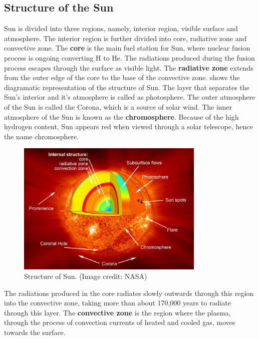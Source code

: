 \message{ !name(main.tex)}\documentclass[12pt]{article}
\begin{document}
\subsection{Structure of the Sun}

Sun is divided into three regions, namely, interior region, visible surface and atmosphere. The interior region is further divided into core, radiative zone and convective zone. The \textbf{core} is the main fuel station for Sun, where nuclear fusion process is ongoing converting H to He. The radiations produced during the fusion process escapes through the surface as visible light. The \textbf{radiative zone} extends from the outer edge of the core to the base of the convective zone.  shows the diagramatic representation of the structure of Sun. The layer that separates the Sun's interior and it's atmosphere is called as photosphere. The outer atmosphere of the Sun is called the Corona, which is a source of solar wind. The inner atmosphere of the Sun is known as the \textbf{chromosphere}. Because of the high hydrogen content, Sun appears red when viewed through a solar telescope, hence the name chromosphere.

\begin{figure}[ht]
    \centering
    \includegraphics[width=0.8\textwidth]{images/structure_of_sun.jpg}
    \caption[Structure of the Sun]{Structure of Sun. (Image credit: NASA)}
    \label{fig:structure_of_sun}
\end{figure}

The radiations produced in the core radiates slowly outwards through this region into the convective zone, taking more than about 170,000 years to radiate through this layer. The \textbf{convective zone} is the region where the plasma, through the process of convection currents of heated and cooled gas, moves towards the surface.
\end{document}
